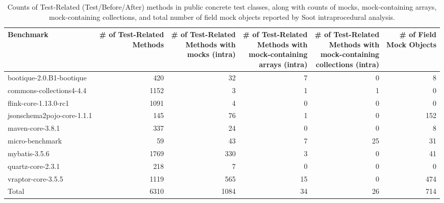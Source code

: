 \begin{table*}
	\centering
	\caption{Counts of Test-Related (Test/Before/After) methods in public concrete test classes, along with counts of mocks, mock-containing arrays, mock-containing collections, and total number of field mock objects reported by Soot intraprocedural analysis.}
	\begin{tabular}{lrrrrr}
		\toprule
		Benchmark & \thead{\# of Test-Related \\ Methods} & \thead{\# of Test-Related \\ Methods with \\ mocks (intra)}  & \thead{\# of Test-Related \\ Methods with \\ mock-containing\\ arrays (intra)} & \thead{\# of Test-Related \\ Methods with \\ mock-containing\\ collections (intra)} & \thead{\# of Field \\ Mock Objects} \\
		\midrule
		bootique-2.0.B1-bootique           		&  420        &  32  & 7 & 0     &   8   \\
		commons-collections4-4.4          		&  1152       &  3   & 1 & 1     &   0   \\
		flink-core-1.13.0-rc1           		&  1091       &  4   & 0 & 0     &   0   \\
		jsonschema2pojo-core-1.1.1           	&  145        &  76  & 1 & 0     &   152  \\
		maven-core-3.8.1	           			&  337        &  24  & 0 & 0     &   8    \\
		micro-benchmark         		  		&  59         &  43  & 7 & 25    &   31   \\
		mybatis-3.5.6         		  			&  1769       &  330 & 3 & 0     &   41   \\	
		quartz-core-2.3.1         	  			&  218     	  &  7   & 0 & 0     &   0    \\
		vraptor-core-3.5.5         	  			&  1119       &  565 & 15 & 0    &   474  \\
		\bottomrule
		Total        	  						&  6310       &  1084  & 34 & 26  &  714   \\
	\end{tabular}
	\label{tab:mocks}
\end{table*}

